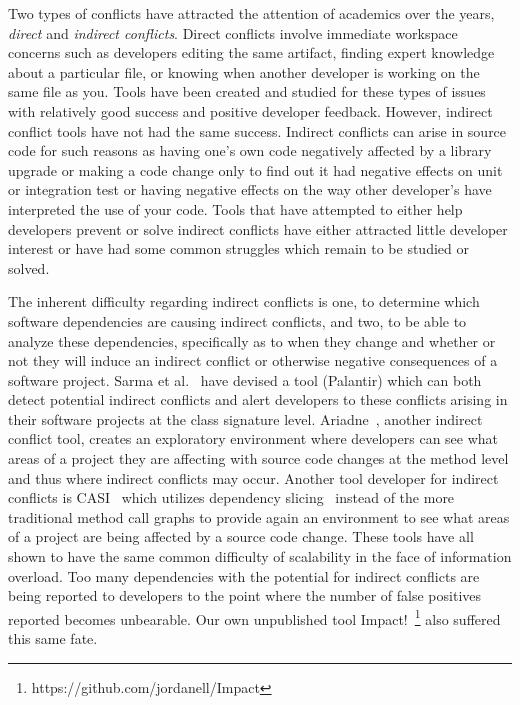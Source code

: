 \documentclass[conference]{IEEEtran}
\begin{document}
Two types of conflicts have attracted the attention of academics over the years, \textit{direct} and 
\textit{indirect conflicts}. Direct conflicts involve immediate workspace concerns such as developers editing the same
artifact, finding expert knowledge about a particular file, or knowing when another developer is working on
the same file as you. Tools have been created and studied for these types of issues
~\cite{Xiang:2008:ERT, Biehl:2007:FVD, Sarma:2009:TIV, Khurana:2009:PFC} with relatively good success and 
positive developer feedback. However, indirect conflict tools have not had the same success. Indirect conflicts
can arise in source code for such reasons as having one's own code negatively affected by a library upgrade or
making a code change only to find out it had negative effects on unit or integration test or  having negative effects
on the way other developer's have interpreted the use of your code. Tools that have attempted to either
help developers prevent or solve indirect conflicts have either attracted little developer interest or have
had some common struggles which remain to be studied or solved.

The inherent difficulty regarding indirect conflicts is one, to determine which software dependencies are
causing indirect conflicts, and two, to be able to analyze these dependencies, specifically as to when they change
and whether or not they will induce an indirect conflict or otherwise negative consequences of a software project.
Sarma et al.~\cite{Sarma:2007:TSA} have devised a tool (Palantir) which can both detect potential indirect conflicts and alert
developers to these conflicts arising in their software projects at the class signature level. Ariadne~\cite{Trainer:2005:BGT}, another indirect 
conflict tool, creates an exploratory environment where developers can see what areas of a project they are affecting with
source code changes at the method level and thus where indirect conflicts may occur. 
Another tool developer for indirect conflicts is CASI~\cite{Servant:2010:CPI}
which utilizes dependency slicing~\cite{Bajracharya:2009:SIS} instead of the more traditional method call graphs to provide 
again an environment to see what areas of a project are being affected by a source code change. 
These tools have all shown to have the same common difficulty of scalability in the face of information overload. Too many
dependencies with the potential for indirect conflicts are being reported to developers to the point where the number of false
positives reported becomes unbearable. Our own unpublished tool Impact!~\footnote{https://github.com/jordanell/Impact} also suffered this same fate.
\end{document}
